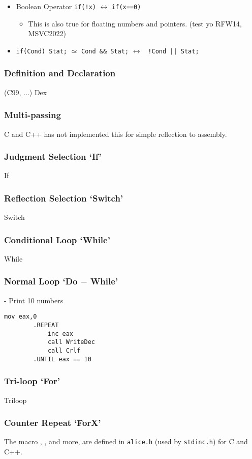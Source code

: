 \begin{itemize}
	\item{Boolean Operator \verb|if(!x)| $\leftrightarrow$ \verb|if(x==0)|
		\begin{itemize}\item This is also true for floating numbers and pointers. (test yo RFW14, MSVC2022) \end{itemize}
	}
	
	\item{\verb|if(Cond) Stat;| $\simeq$ \verb|Cond && Stat;| $\leftrightarrow$ \verb# !Cond || Stat; #
	}
\end{itemize}

\subsubsection{Definition and Declaration} (C99, ...)
{Dex}

\subsubsection{Multi-passing}

	C and C++ has not implemented this for simple reflection to assembly.

\subsubsection{Judgment Selection `If'}
{If}

\subsubsection{Reflection Selection `Switch'}
{Switch}

\subsubsection{Conditional Loop `While'}
{While}
	
\subsubsection{Normal Loop `Do $-$ While'}

	 - Print 10 numbers
	\begin{lstlisting}[language={[x86masm]Assembler}]
		mov eax,0
		.REPEAT
			inc eax
			call WriteDec
			call Crlf
		.UNTIL eax == 10
	\end{lstlisting}


\subsubsection{Tri-loop `For'}
{Triloop}


\subsubsection{Counter Repeat `ForX'}

	The macro , ,  and more, 
	are defined in \verb|alice.h| (used by \verb`stdinc.h`) for C and C++.


